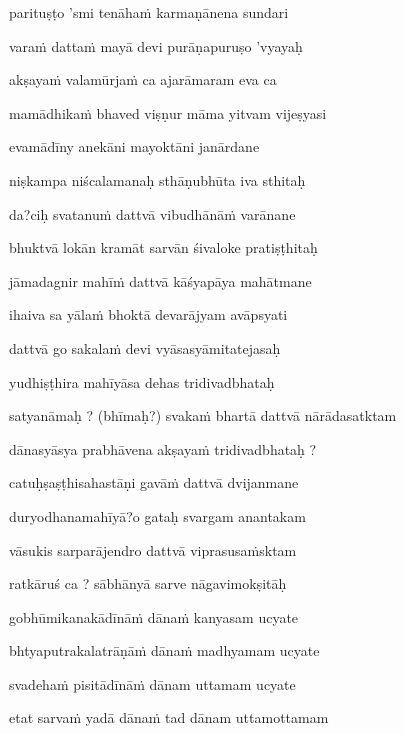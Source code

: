 parituṣṭo 'smi tenāhaṁ karmaṇānena sundari\thinspace{\dandab} \dontdisplaylinenum

varaṁ dattaṁ mayā devi purāṇapuruṣo 'vyayaḥ \veg\dontdisplaylinenum

akṣayaṁ valamūrjaṁ ca ajarāmaram eva ca\thinspace{\dandab} \dontdisplaylinenum

mamādhikaṁ bhaved viṣṇur māma yitvam vijeṣyasi \veg\dontdisplaylinenum

evamādīny anekāni mayoktāni janārdane\thinspace{\dandab} \dontdisplaylinenum

niṣkampa niścalamanaḥ sthāṇubhūta iva sthitaḥ \veg\dontdisplaylinenum

da?ciḥ svatanuṁ dattvā vibudhānāṁ varānane\thinspace{\dandab} \dontdisplaylinenum

bhuktvā lokān kramāt sarvān śivaloke pratiṣṭhitaḥ \veg\dontdisplaylinenum

jāmadagnir mahīṁ dattvā kāśyapāya mahātmane\thinspace{\dandab} \dontdisplaylinenum

ihaiva sa yālaṁ bhoktā devarājyam avāpsyati \veg\dontdisplaylinenum 

dattvā go sakalaṁ devi vyāsasyāmitatejasaḥ\thinspace{\dandab} \dontdisplaylinenum

yudhiṣṭhira mahīyāsa dehas tridivadbhataḥ \veg\dontdisplaylinenum

satyanāmaḥ ? (bhīmaḥ?) svakaṁ bhartā dattvā nārādasatktam\thinspace{\dandab} \dontdisplaylinenum

dānasyāsya prabhāvena akṣayaṁ tridivadbhataḥ ? \veg\dontdisplaylinenum

catuḥṣaṣṭhisahastāṇi gavāṁ dattvā dvijanmane\thinspace{\dandab} \dontdisplaylinenum

duryodhanamahīyā?o gataḥ svargam anantakam \veg\dontdisplaylinenum

vāsukis sarparājendro dattvā viprasusaṁsktam\thinspace{\dandab} \dontdisplaylinenum

ratkāruś ca ? sābhānyā sarve nāgavimokṣitāḥ \veg\dontdisplaylinenum

gobhūmikanakādīnāṁ dānaṁ kanyasam ucyate\thinspace{\dandab} \dontdisplaylinenum

bhtyaputrakalatrāṇāṁ dānaṁ madhyamam ucyate \veg\dontdisplaylinenum

svadehaṁ pisitādīnāṁ dānam uttamam ucyate\thinspace{\dandab} \dontdisplaylinenum

etat sarvaṁ yadā dānaṁ tad dānam uttamottamam \veg\dontdisplaylinenum
{}

